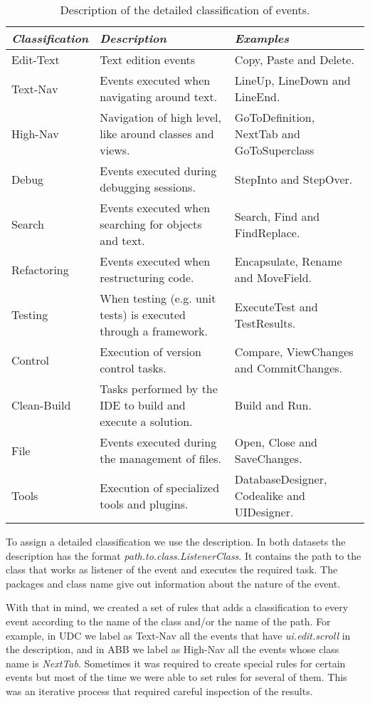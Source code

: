 \begin{table}[ht!]
	\small
	\caption{Description of the detailed classification of events. }
	\label{tbl:detailed_events}
	\centering
	\begin{tabular}{p{2cm}|p{4.5cm}|p{4.5cm}} 
		\hline 
		\emph{Classification} & \emph{Description} & \emph{Examples} \\  
		\hline 
		\hline 
		Edit-Text &  Text edition events & Copy, Paste and Delete. \\
		\hline
		Text-Nav & Events executed when navigating around text. & LineUp, LineDown and LineEnd.  \\
		\hline
		High-Nav & Navigation of high level, like around classes and views. & GoToDefinition, NextTab and GoToSuperclass \\
		\hline
		Debug & Events executed during debugging sessions. & StepInto and StepOver. \\
		\hline
		Search & Events executed when searching for objects and text. & Search, Find and FindReplace. \\
		\hline
		Refactoring & Events executed when restructuring code. & Encapsulate, Rename and MoveField. \\
		\hline
		Testing & When testing (e.g. unit tests) is executed through a framework. & ExecuteTest and TestResults. \\
		\hline
		Control & Execution of version control tasks. & Compare, ViewChanges and CommitChanges. \\
		\hline
		Clean-Build & Tasks performed by the IDE to build and execute a solution.  & Build and Run. \\
		\hline
		File & Events executed during the management of files. & Open, Close and SaveChanges. \\
		\hline
		Tools & Execution of specialized tools and plugins. & DatabaseDesigner, Codealike and UIDesigner.\\
		\hline
	\end{tabular}
	
\end{table}

To assign a detailed classification we use the description. In both datasets the description has the format \emph{path.to.class.ListenerClass}. It contains the path to the class that works as listener of the event and executes the required task. The packages and class name give out information about the nature of the event.

With that in mind, we created a set of rules that adds a classification to every event according to the name of the class and/or the name of the path. For example, in UDC we label as Text-Nav all the events that have \emph{ui.edit.scroll} in the description, and in ABB we label as High-Nav all the events whose class name is \emph{NextTab}. Sometimes it was required to create special rules for certain events but most of the time we were able to set rules for several of them. This was an iterative process that required careful inspection of the results.

